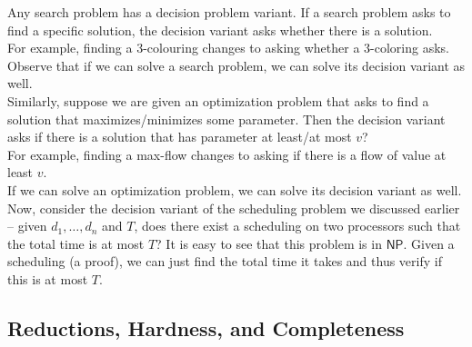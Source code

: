 	Any search problem has a decision problem variant. If a search problem asks to find a specific solution, the decision variant asks whether there is a solution.\\
	For example, finding a $3$-colouring changes to asking whether a $3$-coloring asks.\\
	Observe that if we can solve a search problem, we can solve its decision variant as well.\\

	Similarly, suppose we are given an optimization problem that asks to find a solution that maximizes/minimizes some parameter. Then the decision variant asks if there is a solution that has parameter at least/at most $v$?\\
	For example, finding a max-flow changes to asking if there is a flow of value at least $v$.\\
	If we can solve an optimization problem, we can solve its decision variant as well.\\

	Now, consider the decision variant of the scheduling problem we discussed earlier -- given $d_1,\ldots,d_n$ and $T$, does there exist a scheduling on two processors such that the total time is at most $T$? It is easy to see that this problem is in $\mathsf{NP}$. Given a scheduling (a proof), we can just find the total time it takes and thus verify if this is at most $T$.

\subsection{Reductions, Hardness, and Completeness}

